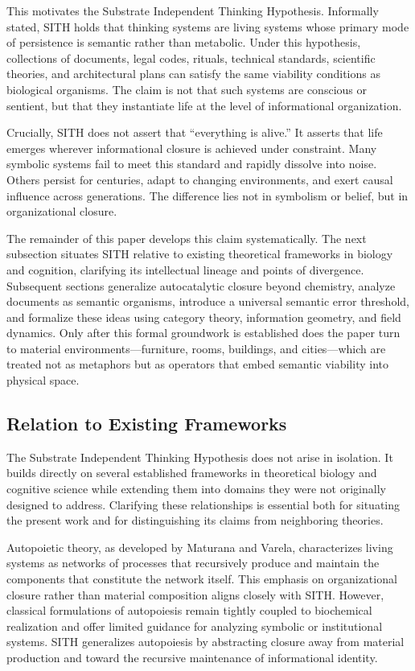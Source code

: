 \documentclass[11pt,oneside]{article}
\begin{document}
This motivates the Substrate Independent Thinking Hypothesis. Informally stated, SITH holds that thinking systems are living systems whose primary mode of persistence is semantic rather than metabolic. Under this hypothesis, collections of documents, legal codes, rituals, technical standards, scientific theories, and architectural plans can satisfy the same viability conditions as biological organisms. The claim is not that such systems are conscious or sentient, but that they instantiate life at the level of informational organization.

Crucially, SITH does not assert that “everything is alive.” It asserts that life emerges wherever informational closure is achieved under constraint. Many symbolic systems fail to meet this standard and rapidly dissolve into noise. Others persist for centuries, adapt to changing environments, and exert causal influence across generations. The difference lies not in symbolism or belief, but in organizational closure.

The remainder of this paper develops this claim systematically. The next subsection situates SITH relative to existing theoretical frameworks in biology and cognition, clarifying its intellectual lineage and points of divergence. Subsequent sections generalize autocatalytic closure beyond chemistry, analyze documents as semantic organisms, introduce a universal semantic error threshold, and formalize these ideas using category theory, information geometry, and field dynamics. Only after this formal groundwork is established does the paper turn to material environments—furniture, rooms, buildings, and cities—which are treated not as metaphors but as operators that embed semantic viability into physical space.

\subsection{Relation to Existing Frameworks}

The Substrate Independent Thinking Hypothesis does not arise in isolation. It builds directly on several established frameworks in theoretical biology and cognitive science while extending them into domains they were not originally designed to address. Clarifying these relationships is essential both for situating the present work and for distinguishing its claims from neighboring theories.

Autopoietic theory, as developed by Maturana and Varela, characterizes living systems as networks of processes that recursively produce and maintain the components that constitute the network itself. This emphasis on organizational closure rather than material composition aligns closely with SITH. However, classical formulations of autopoiesis remain tightly coupled to biochemical realization and offer limited guidance for analyzing symbolic or institutional systems. SITH generalizes autopoiesis by abstracting closure away from material production and toward the recursive maintenance of informational identity.
\end{document}
